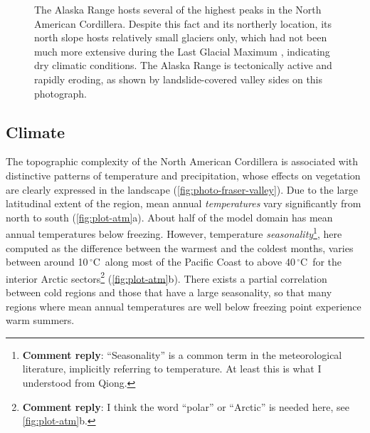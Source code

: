 \documentclass{article}
\newcommand{\renote}[1]{\footnote{\textbf{Comment reply}: #1}}
\newcommand{\unit}[1]{\ensuremath{\mathrm{#1}}}
\newcommand{\degree}[0]{\ensuremath{^{\circ}}}
\newcommand{\degC}[0]{\unit{{\degree}C}}
\begin{document}
\begin{figure}
  \centering
  \caption{The Alaska Range hosts several of the highest peaks in the North
           American Cordillera. Despite this fact and its northerly location,
           its north slope hosts relatively small glaciers only, which had not
           been much more extensive during the Last Glacial Maximum
           \citep{Kaufman.Manley.2004}, indicating dry climatic conditions.
           The Alaska Range is tectonically active and rapidly eroding, as
           shown by landslide-covered valley sides on this photograph.}
  \label{fig:photo-alaska-range}
\end{figure}

\subsection{Climate}

The topographic complexity of the North American Cordillera is associated with
distinctive patterns of temperature and precipitation, whose effects on
vegetation are clearly expressed in the landscape
(\cref{fig:photo-fraser-valley}). Due to the large latitudinal extent of the
region, mean annual \emph{temperatures} vary significantly from north to south
(\cref{fig:plot-atm}a). About half of the model domain has mean annual
temperatures below freezing. However, temperature \emph{seasonality}\renote{
    ``Seasonality'' is a common term in the meteorological literature,
    implicitly referring to temperature. At least this is what I understood
    from Qiong.},
here computed as the difference between the warmest and the coldest months,
varies between around 10\,\degC\ along most of the Pacific Coast to above
40\,\degC\ for the interior Arctic sectors\renote{
    I think the word ``polar'' or ``Arctic'' is needed here, see
    \cref{fig:plot-atm}b.}
(\cref{fig:plot-atm}b). There exists a
partial correlation between cold regions and those that have a large
seasonality, so that many regions where mean annual temperatures are well below
freezing point experience warm summers.
\end{document}
